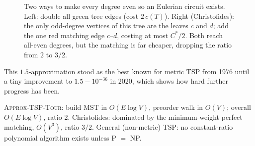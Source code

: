 \begin{figure}[h]
\centering
{}
\caption{Two ways to make every degree even so an Eulerian circuit exists.
Left: double all green tree edges (cost $2\,c(T)$). Right (Christofides): the
only odd-degree vertices of this tree are the leaves $c$ and $d$; add the one
red matching edge $c\text{--}d$, costing at most $C^{*}/2$. Both reach all-even
degrees, but the matching is far cheaper, dropping the ratio from $2$ to
$3/2$.}
\label{ch34:christofides}
\end{figure}

This $1.5$-approximation stood as the best known for metric TSP from 1976
until a tiny improvement to $1.5 - 10^{-36}$ in 2020, which shows how hard
further progress has been.

\begin{complexitybox}
\textsc{Approx-TSP-Tour}: build MST in $O(E\log V)$, preorder walk in $O(V)$;
overall $O(E\log V)$, ratio $2$. Christofides: dominated by the
minimum-weight perfect matching, $O(V^{3})$, ratio $3/2$. General
(non-metric) TSP: no constant-ratio polynomial algorithm exists unless
P $=$ NP.
\end{complexitybox}

